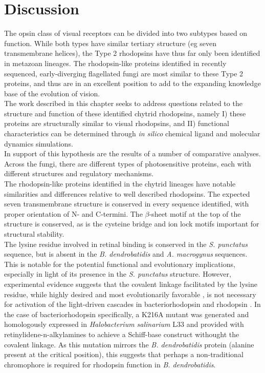 \section{Discussion}
The opsin class of visual receptors can be divided into two subtypes based on function. While both types have similar tertiary structure (eg seven transmembrane helices), the Type 2 rhodopsins have thus far only been identified in metazoan lineages. The rhodopsin-like proteins identified in recently sequenced, early-diverging flagellated fungi are most similar to these Type 2 proteins, and thus are in an excellent position to add to the expanding knowledge base of the evolution of vision.\\
\indent The work described in this chapter seeks to address questions related to the structure and function of these identified chytrid rhodopsins, namely I) these proteins are structurally similar to visual rhodopsins, and II) functional characteristics can be determined through \textit{in silico} chemical ligand and molecular dynamics simulations.\\
\indent In support of this hypothesis are the results of a number of comparative analyses. Across the fungi, there are different types of photosensitive proteins, each with different structures and regulatory mechanisms.\\
\indent The rhodopsin-like proteins identified in the chytrid lineages have notable similarities and differences relative to well described rhodopsins. The expected seven transmembrane structure is conserved in every sequence identified, with proper orientation of N- and C-termini. The $\beta$-sheet motif at the top of the structure is conserved, as is the cysteine bridge and ion lock motifs important for structural stability.\\
\indent The lysine residue involved in retinal binding is conserved in the \textit{S. punctatus} sequence, but is absent in the \textit{B. dendrobatidis} and \textit{A. macrogynus} sequences. This is notable for the potential functional and evolutionary implications, especially in light of its presence in the \textit{S. punctatus} structure. However, experimental evidence suggests that the covalent linkage facilitated by the lysine residue, while highly desired and most evolutionarily favorable \cite{Sekharan2011}, is not necessary for activation of the light-driven cascades in bacteriorhodopsin \cite{Schweiger1994} and rhodopsin \cite{Zhukovsky1992}. In the case of bacteriorhodopsin specifically, a K216A mutant was generated and homologously expressed in \textit{Halobacterium salinarium} L33 and provided with retinylidene-n-alkylamines to achieve a Schiff-base construct withought the covalent linkage. As this mutation mirrors the \textit{B. dendrobatidis} protein (alanine present at the critical position), this suggests that perhaps a non-traditional chromophore is required for rhodopsin function in \textit{B. dendrobatidis}.\\
